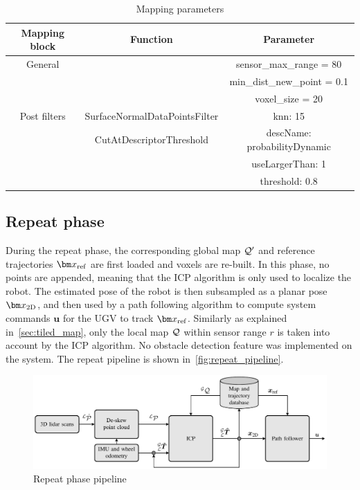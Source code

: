 \begin{table}[htpb]
	\caption{Mapping parameters}
	\begin{center}
		\begin{tabular}{c c c} \toprule
			Mapping block & Function                      & Parameter                    \\
			\midrule
			General       &                               & sensor\_max\_range = 80      \\
			              &                               & min\_dist\_new\_point = 0.1  \\
			              &                               & voxel\_size = 20             \\
			\midrule
			Post filters  & SurfaceNormalDataPointsFilter & knn: 15                      \\
			              & CutAtDescriptorThreshold      & descName: probabilityDynamic \\
			              &                               & useLargerThan: 1             \\
			              &                               & threshold: 0.8               \\
			\bottomrule
		\end{tabular}
	\end{center}
	\label{tab:mapping_params}
\end{table}

\subsection{Repeat phase}
\label{sec:repeat_phase}

During the repeat phase, the corresponding global map $\mathcal{Q}'$ and reference trajectories $\reftraj$ are first loaded and voxels are re-built.
In this phase, no points are appended, meaning that the \ac{ICP} algorithm is only used to localize the robot.
The estimated pose of the robot \transform{\robotf}{\mapf} is then subsampled as a planar pose $\poseplane$, and then used by a path following algorithm to compute system commands $\bm u$ for the \ac{UGV} to track $\reftraj$.
Similarly as explained in~\autoref{sec:tiled_map}, only the local map $\mathcal{Q}$ within sensor range $r$ is taken into account by the \ac{ICP} algorithm.
No obstacle detection feature was implemented on the system.
The repeat pipeline is shown in~\autoref{fig:repeat_pipeline}.

\begin{figure} [htpb]
	\centering
	\includegraphics[width=.95\linewidth]{figs/Repeat_pipeline/repeat_pipeline.pdf}
	\caption{Repeat phase pipeline}
	\label{fig:repeat_pipeline}
\end{figure}


